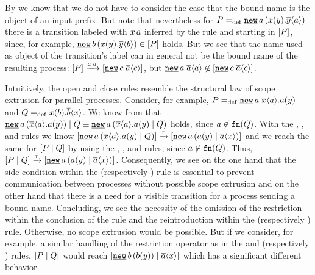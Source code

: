 By  we know that we do not have to consider the case that the bound name is the object of an input prefix. But note that nevertheless for $P\define\procres[()]{a}{\inp{x}{y}.\out{y}{a}}$ there is a transition labeled with $x\,a$ inferred by the \eres{} rule and starting in $\left[P\right]$, since, for example, $\procres[()]{b}{\inp{x}{y}.\out{y}{b}}\in\ec{P}$ holds. But we see that the name used as object of the transition's label can in general not be the bound name of the resulting process: $\ec{P}\intrans{x}{a}\ec{\procres[]{c}{\out{a}{c}}}$, but $\procres[]{a}{\out{a}{a}}\nin\ec{\procres[]{c}{\out{a}{c}}}$.

Intuitively, the open and close rules resemble the structural law of scope extrusion for parallel processes. Consider, for example, $P\define\procres[]{a}{\out{x}{a}.\inp{a}{y}}$ and $Q=_{\mathrm{def}}x(b).\overline{b}\langle x\rangle$. We know from  that $\procpar{\procres[()]{a}{\out{x}{a}.\inp{a}{y}}}{Q}\struc\procres[()]{a}{\procpar{\out{x}{a}.\inp{a}{y}}{Q}}$ holds, since $a\not\in\mathtt{fn}(Q)$. With the \ein{}, \eout{}, \ecoml{} and \eres{} rules we know $\ec{\procres[()]{a}{\procpar{\out{x}{a}.\inp{a}{y}}{Q}}}\tautrans\ec{\procres[()]{a}{\procpar{\inp{a}{y}}{\out{a}{x}}}}$ and we reach the same for $\left[P \mid Q\right]$ by using the \eout{}, \eopen{}, \ein{} and \eclosel{} rules, since $a\not\in\mathtt{fn}(Q)$. Thus, $\ec{\procpar{P}{Q}}\tautrans\ec{\procres[()]{a}{\procpar{\inp{a}{y}}{\out{a}{x}}}}$. Consequently, we see on the one hand that the side condition within the \eclosel{} (respectively \ecloser{}) rule is essential to prevent communication between processes without possible scope extrusion and on the other hand that there is a need for a visible transition for a process sending a bound name. Concluding, we see the necessity of the omission of the restriction within the conclusion of the \eopen{} rule and the reintroduction within the \eclosel{} (respectively \ecloser{}) rule. Otherwise, no scope extrusion would be possible. But if we consider, for example, a similar handling of the restriction operator as in the \eres{} and \ecoml{} (respectively \ecomr{}) rules, $\left[P \mid Q\right]$ would reach $\ec{\procpar{\procres[()]{b}{\inp{b}{y}}}{\out{a}{x}}}$ which has a significant different behavior.

